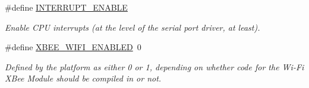 \begin{DoxyCompactItemize}
\#define \hyperlink{group__hal_gacf43057fc38f77d20456c074909ba772}{I\+N\+T\+E\+R\+R\+U\+P\+T\+\_\+\+E\+N\+A\+B\+LE}
\begin{DoxyCompactList}\small\item\em Enable C\+PU interrupts (at the level of the serial port driver, at least). \end{DoxyCompactList}\item 
\mbox{\label{group__hal_ga3847c218bf0c9d56e1a01b87ae7c1900}} 
\#define \hyperlink{group__hal_ga3847c218bf0c9d56e1a01b87ae7c1900}{X\+B\+E\+E\+\_\+\+W\+I\+F\+I\+\_\+\+E\+N\+A\+B\+L\+ED}~0
\begin{DoxyCompactList}\small\item\em Defined by the platform as either 0 or 1, depending on whether code for the Wi-\/\+Fi X\+Bee Module should be compiled in or not. \end{DoxyCompactList}\end{DoxyCompactItemize}
